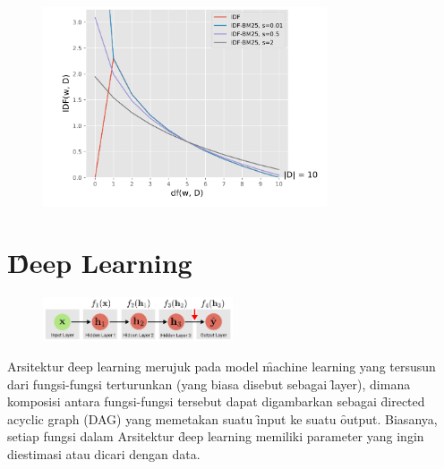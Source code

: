     \begin{figure}[!ht]
        \centering
        \includegraphics[width=0.75\textwidth]{assets/pics/smoothed-idf.png}
        \label{fig:smoothed-idf}
    \end{figure}


\section{\f{Deep Learning}}
    \begin{figure}[!ht]
        \centering
        \includegraphics[width=0.50\textwidth]{assets/pics/dag-dl.png}
        \label{fig:deep-learning-FFN-dag}
    \end{figure}
    Arsitektur \f{deep learning} merujuk pada model \f{machine learning} yang tersusun dari fungsi-fungsi terturunkan (yang biasa disebut sebagai \f{layer}), dimana komposisi antara fungsi-fungsi tersebut dapat digambarkan sebagai \f{directed acyclic graph} (DAG) yang memetakan suatu \f{input} ke suatu \f{output}. Biasanya, setiap fungsi dalam Arsitektur \f{deep learning} memiliki parameter yang ingin diestimasi atau dicari dengan data.
    

